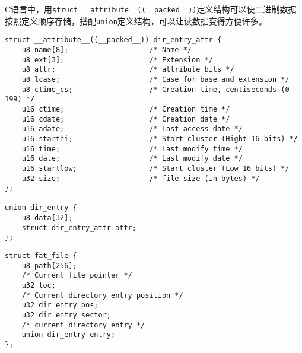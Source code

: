 C语言中，用\texttt{struct \_\_attribute\_\_((\_\_packed\_\_))}定义结构可以使二进制数据按照定义顺序存储，搭配\texttt{union}定义结构，可以让读数据变得方便许多。

\begin{lstlisting}[caption=短文件名元数据]
struct __attribute__((__packed__)) dir_entry_attr {
    u8 name[8];                   /* Name */
    u8 ext[3];                    /* Extension */
    u8 attr;                      /* attribute bits */
    u8 lcase;                     /* Case for base and extension */
    u8 ctime_cs;                  /* Creation time, centiseconds (0-199) */
    u16 ctime;                    /* Creation time */
    u16 cdate;                    /* Creation date */
    u16 adate;                    /* Last access date */
    u16 starthi;                  /* Start cluster (Hight 16 bits) */
    u16 time;                     /* Last modify time */
    u16 date;                     /* Last modify date */
    u16 startlow;                 /* Start cluster (Low 16 bits) */
    u32 size;                     /* file size (in bytes) */
};

union dir_entry {
    u8 data[32];
    struct dir_entry_attr attr;
};
\end{lstlisting}


\begin{lstlisting}[caption=文件结构]
struct fat_file {
    u8 path[256];
    /* Current file pointer */
    u32 loc;
    /* Current directory entry position */
    u32 dir_entry_pos;
    u32 dir_entry_sector;
    /* current directory entry */
    union dir_entry entry;
};
\end{lstlisting}



